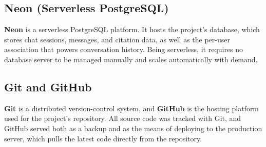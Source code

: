 \subsection{Neon (Serverless PostgreSQL)}
\textbf{Neon} is a serverless PostgreSQL platform. It hosts the project's database, which
stores chat sessions, messages, and citation data, as well as the per-user association
that powers conversation history. Being serverless, it requires no database server to be
managed manually and scales automatically with demand.

\subsection{Git and GitHub}
\textbf{Git} is a distributed version-control system, and \textbf{GitHub} is the hosting
platform used for the project's repository. All source code was tracked with Git, and
GitHub served both as a backup and as the means of deploying to the production server,
which pulls the latest code directly from the repository.

